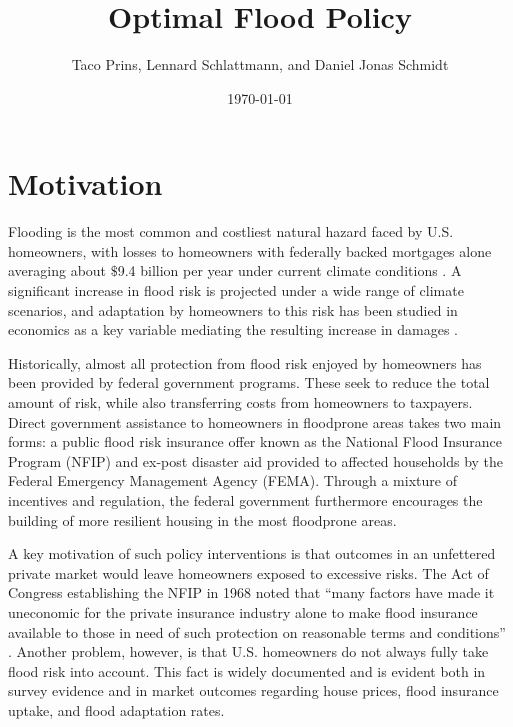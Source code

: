 \documentclass[12pt]{article}
\title{Optimal Flood Policy}
\author{Taco Prins, Lennard Schlattmann, and Daniel Jonas Schmidt}
\date{\today}
\begin{document}
\maketitle

\section{Motivation}
\label{sec:motivation}

Flooding is the most common and costliest natural hazard faced by U.S. homeowners, with losses to homeowners with federally backed mortgages alone averaging about $\$$9.4 billion per year under current climate conditions \citep{cbo2023flooddamage}. A significant increase in flood risk is projected under a wide range of climate scenarios, and adaptation by homeowners to this risk has been studied in economics as a key variable mediating the resulting increase in damages \citep{desmet2018evaluating}. 

Historically, almost all protection from flood risk enjoyed by homeowners has been provided by federal government programs. These seek to reduce the total amount of risk, while also transferring costs from homeowners to taxpayers. Direct government assistance to homeowners in floodprone areas takes two main forms: a public flood risk insurance offer known as the National Flood Insurance Program (NFIP) and ex-post disaster aid provided to affected households by the Federal Emergency Management Agency (FEMA). Through a mixture of incentives and regulation, the federal government furthermore encourages the building of more resilient housing in the most floodprone areas.

A key motivation of such policy interventions is that outcomes in an unfettered private market would leave homeowners exposed to excessive risks. The Act of Congress establishing the NFIP in 1968 noted that ``many factors have made it uneconomic for the private insurance industry alone to make flood insurance available to those in need of such protection on reasonable terms and conditions'' \citep{nfia1968}. Another problem, however, is that U.S. homeowners do not always fully take flood risk into account. This fact is widely documented and is evident both in survey evidence \citep[e.g.][]{bakkensen2022going,mulder2024mismeasuring} and in market outcomes regarding house prices, flood insurance uptake, and flood adaptation rates. 
\end{document}
